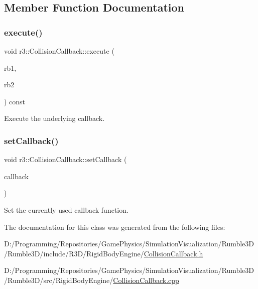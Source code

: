 \subsection{Member Function Documentation}
\mbox{\label{classr3_1_1_collision_callback_afe734fe9303efadfdd6c1abc3910c432}} 
\subsubsection{\texorpdfstring{execute()}{execute()}}
{\footnotesize\ttfamily void r3\+::\+Collision\+Callback\+::execute (\begin{DoxyParamCaption}\item[{\mbox{\hyperlink{classr3_1_1_rigid_body}{Rigid\+Body}} $\ast$}]{rb1,  }\item[{\mbox{\hyperlink{classr3_1_1_rigid_body}{Rigid\+Body}} $\ast$}]{rb2 }\end{DoxyParamCaption}) const}



Execute the underlying callback. 

\mbox{\label{classr3_1_1_collision_callback_ab6a33e6f074ebd6860f396c3b0a78423}} 
\subsubsection{\texorpdfstring{set\+Callback()}{setCallback()}}
{\footnotesize\ttfamily void r3\+::\+Collision\+Callback\+::set\+Callback (\begin{DoxyParamCaption}\item[{const \mbox{\hyperlink{classr3_1_1_collision_callback_afcd5494eafdbd1a0956589b6ec9c0728}{Callback}} \&}]{callback }\end{DoxyParamCaption})}



Set the currently used callback function. 



The documentation for this class was generated from the following files\+:\begin{DoxyCompactItemize}
\item 
D\+:/\+Programming/\+Repositories/\+Game\+Physics/\+Simulation\+Visualization/\+Rumble3\+D/\+Rumble3\+D/include/\+R3\+D/\+Rigid\+Body\+Engine/\mbox{\hyperlink{_collision_callback_8h}{Collision\+Callback.\+h}}\item 
D\+:/\+Programming/\+Repositories/\+Game\+Physics/\+Simulation\+Visualization/\+Rumble3\+D/\+Rumble3\+D/src/\+Rigid\+Body\+Engine/\mbox{\hyperlink{_collision_callback_8cpp}{Collision\+Callback.\+cpp}}\end{DoxyCompactItemize}
